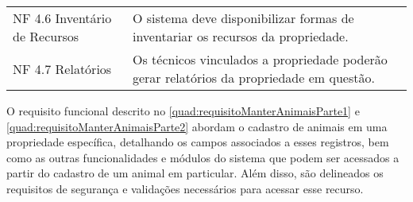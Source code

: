 \begin{tabframed}[htb]
\begin{tabular}{|l|l|}
    NF 4.6 Inventário de Recursos         &
    \multicolumn{1}{|p{9cm}|}{\raggedright O sistema deve disponibilizar formas de inventariar os recursos da propriedade.}
    \\ \cline{1-2}

    NF 4.7 Relatórios                     &
    \multicolumn{1}{|p{9cm}|}{\raggedright Os técnicos vinculados a propriedade poderão gerar relatórios da propriedade em questão.}
    \\ \cline{1-2}
  \end{tabular}
  \fonte{} %
\end{tabframed}

\clearpage

O requisito funcional descrito no \autoref{quad:requisitoManterAnimaisParte1} e \autoref{quad:requisitoManterAnimaisParte2} abordam o cadastro de animais em uma propriedade específica, detalhando os campos associados a esses registros, bem como as outras funcionalidades e módulos do sistema que podem ser acessados a partir do cadastro de um animal em particular. Além disso, são delineados os requisitos de segurança e validações necessários para acessar esse recurso.

